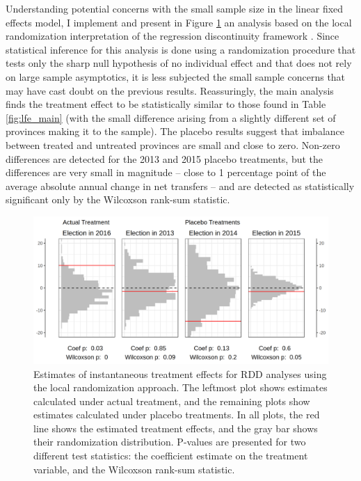 \documentclass[12pt]{article}
\newcommand{\1}{\mathbbm{1}}
\begin{document}
Understanding potential concerns with the small sample size in the linear fixed effects model, I implement and present in Figure \ref{fig:rdd_placebo} an analysis based on the local randomization interpretation of the regression discontinuity framework \citep{CattaneoTitiunik2015}. Since statistical inference for this analysis is done using a randomization procedure that tests only the sharp null hypothesis of no individual effect and that does not rely on large sample asymptotics, it is less subjected the small sample concerns that may have cast doubt on the previous results. Reassuringly, the main analysis finds the treatment effect to be statistically similar to those found in Table \ref{fig:lfe_main} (with the small difference arising from a slightly different set of provinces making it to the sample). The placebo results suggest that imbalance between treated and untreated provinces are small and close to zero. Non-zero differences are detected for the 2013 and 2015 placebo treatments, but the differences are very small in magnitude -- close to 1 percentage point of the average absolute annual change in net transfers -- and are detected as statistically significant only by the Wilcoxson rank-sum statistic. 

\begin{figure}[!htbp]
	\centering
	\includegraphics[width=\textwidth]{figure/190311_rdd_results.png}
	\captionsetup{singlelinecheck=off}
	\caption[Estimated RDD treatment effects]{Estimates of instantaneous treatment effects for RDD analyses using the local randomization approach. The leftmost plot shows estimates calculated under actual treatment, and the remaining plots show estimates calculated under placebo treatments. In all plots, the red line shows the estimated treatment effects, and the gray bar shows their randomization distribution. P-values are presented for two different test statistics: the coefficient estimate on the treatment variable, and the Wilcoxson rank-sum statistic.}
	\label{fig:rdd_placebo}
\end{figure}
\end{document}
